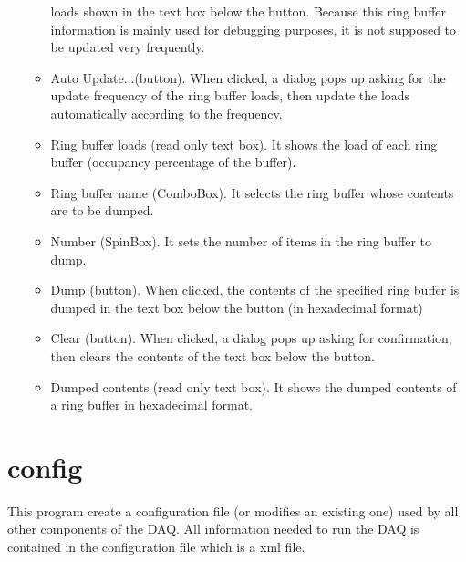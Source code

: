 \documentclass[a4paper,12pt]{article}
\begin{document}
\begin{itemize}
\begin{itemize}
					loads shown in the text box below the button. Because
					this ring buffer information is mainly used for
					debugging purposes, it is not supposed to be updated
					very frequently. 
				\item Auto Update...(button). When clicked, a dialog pops up
					asking for the update frequency of the ring buffer
					loads, then update the loads automatically according to
					the frequency.
				\item Ring buffer loads (read only text box). It shows the
					load of each ring buffer (occupancy percentage of the
					buffer).
				\item Ring buffer name (ComboBox). It selects the ring
					buffer whose contents are to be dumped. 
				\item Number (SpinBox). It sets the number of items in the
					ring buffer to dump.
				\item Dump (button). When clicked, the contents of the
					specified ring buffer is dumped in the text box below
					the button (in hexadecimal format)
				\item Clear (button). When clicked, a dialog pops up asking
					for confirmation, then clears the contents of the text
					box below the button.
				\item Dumped contents (read only text box). It shows the
					dumped contents of a ring buffer in hexadecimal format.
			\end{itemize}
	\end{itemize}
	
	\section{config}
	This program create a configuration file (or modifies an existing one)
	used by all other components of the DAQ. All information needed to run
	the DAQ is contained in the configuration file which is a xml file.
	
\end{document}
